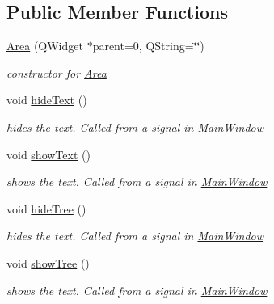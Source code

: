 \subsection*{\-Public \-Member \-Functions}
\begin{DoxyCompactItemize}
\item 
\hyperlink{class_area_a6b4b4faf9f541b9071af669c59b49dd9}{\-Area} (\-Q\-Widget $\ast$parent=0, \-Q\-String=\char`\"{}\char`\"{})
\begin{DoxyCompactList}\small\item\em constructor for \hyperlink{class_area}{\-Area} \end{DoxyCompactList}\item 
\hypertarget{class_area_a93e6b5cec522625ca0ad121fb60c9319}{void \hyperlink{class_area_a93e6b5cec522625ca0ad121fb60c9319}{hide\-Text} ()}\label{class_area_a93e6b5cec522625ca0ad121fb60c9319}

\begin{DoxyCompactList}\small\item\em hides the text. \-Called from a signal in \hyperlink{class_main_window}{\-Main\-Window} \end{DoxyCompactList}\item 
\hypertarget{class_area_a8d4dedd9261bd7299801221b71f6405e}{void \hyperlink{class_area_a8d4dedd9261bd7299801221b71f6405e}{show\-Text} ()}\label{class_area_a8d4dedd9261bd7299801221b71f6405e}

\begin{DoxyCompactList}\small\item\em shows the text. \-Called from a signal in \hyperlink{class_main_window}{\-Main\-Window} \end{DoxyCompactList}\item 
\hypertarget{class_area_ad2d39f0bdbe63a3df0e93baab91139a2}{void \hyperlink{class_area_ad2d39f0bdbe63a3df0e93baab91139a2}{hide\-Tree} ()}\label{class_area_ad2d39f0bdbe63a3df0e93baab91139a2}

\begin{DoxyCompactList}\small\item\em hides the text. \-Called from a signal in \hyperlink{class_main_window}{\-Main\-Window} \end{DoxyCompactList}\item 
\hypertarget{class_area_a536387c9433a7587d4dd23afc3ec2ebd}{void \hyperlink{class_area_a536387c9433a7587d4dd23afc3ec2ebd}{show\-Tree} ()}\label{class_area_a536387c9433a7587d4dd23afc3ec2ebd}

\begin{DoxyCompactList}\small\item\em shows the text. \-Called from a signal in \hyperlink{class_main_window}{\-Main\-Window} \end{DoxyCompactList}\end{DoxyCompactItemize}
